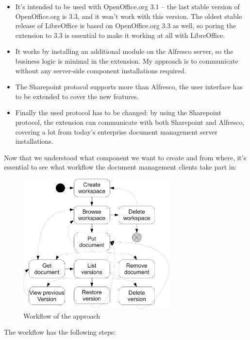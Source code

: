 \begin{itemize}
\item It's intended to be used with OpenOffice.org 3.1 -- the last stable
version of OpenOffice.org is 3.3, and it won't work with this version. The
oldest stable release of LibreOffice is based on OpenOffice.org 3.3 as well, so
poring the extension to 3.3 is essential to make it working at all with
LibreOffice.
\item It works by installing an additional module on the Alfresco server, so
the business logic is minimal in the extension. My approach is to communicate
without any server-side component installations required.
\item The Sharepoint protocol supports more than Alfresco, the user interface
has to be extended to cover the new features.
\item Finally the used protocol has to be changed: by using the Sharepoint
protocol, the extension can communicate with both Sharepoint and Alfresco,
covering a lot from today's enterprise document management server
installations.
\end{itemize}

Now that we understood what component we want to create and from where, it's
essential to see what workflow the document management clients take part in:

\begin{figure}[H]
\centering
\includegraphics[width=300px,keepaspectratio]{overview-workflow.pdf}
\caption{Workflow of the approach}
\end{figure}

The workflow has the following steps:

